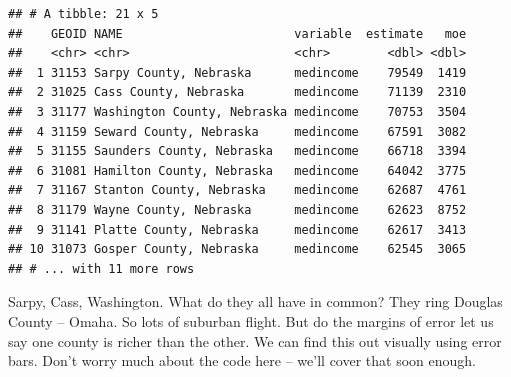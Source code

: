 \documentclass[]{book}
\newenvironment{Shaded}{\begin{snugshade}}{\end{snugshade}}
\newcommand{\DataTypeTok}[1]{\textcolor[rgb]{0.13,0.29,0.53}{#1}}
\newcommand{\KeywordTok}[1]{\textcolor[rgb]{0.13,0.29,0.53}{\textbf{#1}}}
\newcommand{\NormalTok}[1]{#1}
\newcommand{\OperatorTok}[1]{\textcolor[rgb]{0.81,0.36,0.00}{\textbf{#1}}}
\newcommand{\StringTok}[1]{\textcolor[rgb]{0.31,0.60,0.02}{#1}}
\begin{document}
\begin{verbatim}
## # A tibble: 21 x 5
##    GEOID NAME                        variable  estimate   moe
##    <chr> <chr>                       <chr>        <dbl> <dbl>
##  1 31153 Sarpy County, Nebraska      medincome    79549  1419
##  2 31025 Cass County, Nebraska       medincome    71139  2310
##  3 31177 Washington County, Nebraska medincome    70753  3504
##  4 31159 Seward County, Nebraska     medincome    67591  3082
##  5 31155 Saunders County, Nebraska   medincome    66718  3394
##  6 31081 Hamilton County, Nebraska   medincome    64042  3775
##  7 31167 Stanton County, Nebraska    medincome    62687  4761
##  8 31179 Wayne County, Nebraska      medincome    62623  8752
##  9 31141 Platte County, Nebraska     medincome    62617  3413
## 10 31073 Gosper County, Nebraska     medincome    62545  3065
## # ... with 11 more rows
\end{verbatim}

Sarpy, Cass, Washington. What do they all have in common? They ring Douglas County -- Omaha. So lots of suburban flight. But do the margins of error let us say one county is richer than the other. We can find this out visually using error bars. Don't worry much about the code here -- we'll cover that soon enough.

\begin{Shaded}
\end{Shaded}
\end{document}
